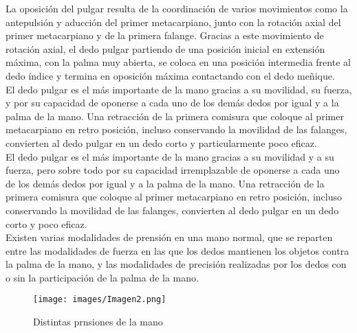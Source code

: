 \documentclass{article}
\begin{document}
La oposición del pulgar resulta de la coordinación de varios movimientos como la antepulsión y aducción del primer metacarpiano, junto con la rotación axial del primer metacarpiano y de la primera falange. Gracias a este movimiento de rotación axial, el dedo pulgar partiendo de una posición inicial en extensión máxima, con la palma muy abierta, se coloca en una posición intermedia frente al dedo índice y termina en oposición máxima contactando con el dedo meñique.
\\
El dedo pulgar es el más importante de la mano gracias a su movilidad, su fuerza, y por su capacidad de oponerse a cada uno de los demás dedos por igual y a la palma de la mano. Una retracción de la primera comisura que coloque al primer metacarpiano en retro posición, incluso conservando la movilidad de las falanges, convierten al dedo pulgar en un dedo corto y particularmente poco eficaz.
\\
El dedo pulgar es el más importante de la mano gracias a su movilidad y a su fuerza, pero sobre todo por su capacidad irremplazable de oponerse a cada uno de los demás dedos por igual y a la palma de la mano. Una retracción de la primera comisura que coloque al primer metacarpiano en retro posición, incluso conservando la movilidad de las falanges, convierten al dedo pulgar en un dedo corto y poco eficaz. 
\\
Existen varias modalidades de prensión en una mano normal, que se reparten entre las modalidades de fuerza en las que los dedos mantienen los objetos contra la palma de la mano, y las modalidades de precisión realizadas por los dedos con o sin la participación de la palma de la mano. 
\\
\begin{figure}[h] %
    \centering
    \texttt{[image: images/Imagen2.png]} %
    \caption{Distintas prnsiones de la mano}
\end{figure}
\end{document}
